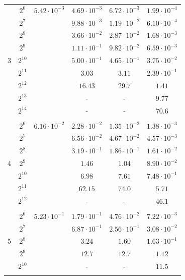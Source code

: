 \documentclass[12pt,oneside]{amsart}
\numberwithin{equation}{section}
\theoremstyle{definition}
\begin{document}
\begin{figure}[p]
{\begin{tabular}{|c|c|cccc|}
          & $2^{6}$ & $5.42 \cdot 10^{-3}$ & $4.69\cdot 10^{-3}$ & $6.72\cdot 10^{-3}$ & $1.99\cdot 10^{-4}$ \\
          & $2^{7}$ & & $9.88\cdot 10^{-3}$ & $1.19\cdot 10^{-2}$ & $6.10\cdot 10^{-4}$ \\
          & $2^{8}$ & & $3.66\cdot 10^{-2}$ & $2.87\cdot 10^{-2}$ & $1.68\cdot 10^{-3}$ \\
          & $2^{9}$ & & $1.11\cdot 10^{-1}$ & $9.82\cdot 10^{-2}$ & $6.59\cdot 10^{-3}$ \\
      3 & $2^{10}$ & & $5.00\cdot 10^{-1}$ & $4.65\cdot 10^{-1}$ & $3.75\cdot 10^{-2}$ \\
          & $2^{11}$ & & $3.03$ & $3.11$ & $2.39\cdot 10^{-1}$ \\
          & $2^{12}$ & & $16.43$ & $29.7$ & $1.41$ \\
          & $2^{13}$ & & - & - & $9.77$ \\
          & $2^{14}$ & & - & - & $70.6$ \\ \hline & &&&&\\[-1em]

          & $2^{6}$ & $6.16 \cdot 10^{-2}$ & $2.28\cdot 10^{-2}$ & $1.35\cdot 10^{-2}$ & $1.38\cdot 10^{-3}$ \\
          & $2^{7}$ & & $6.56\cdot 10^{-2}$ & $4.67\cdot 10^{-2}$ & $4.57\cdot 10^{-3}$ \\
          & $2^{8}$ & & $3.19 \cdot 10^{-1}$ & $1.86\cdot 10^{-1}$ & $1.61\cdot 10^{-2}$ \\
      4 & $2^{9}$ & & $1.46$ & $1.04$ & $8.90\cdot 10^{-2}$ \\
          & $2^{10}$ & & $6.98$ & $7.61$ & $7.48\cdot 10^{-1}$ \\
          & $2^{11}$ & & $62.15$ & $74.0$ & $5.71$ \\
          & $2^{12}$ & & - & - & $46.1$ \\ \hline & &&&&\\[-1em]

          & $2^{6}$ & $5.23\cdot 10^{-1}$ & $1.79\cdot 10^{-1}$ & $4.76\cdot 10^{-2}$ & $7.22\cdot 10^{-3}$ \\
          & $2^{7}$ & & $6.87\cdot 10^{-1}$ & $2.56\cdot 10^{-1}$ & $3.08 \cdot 10^{-2}$ \\
      5 & $2^{8}$ & & $3.24$ & $1.60$& $1.63\cdot 10^{-1}$ \\
          & $2^{9}$ & & $12.7$ & $12.7$ & $1.12$ \\
          & $2^{10}$ & & - & - & $11.5$ \\ \hline & &&&&\\[-1em]


\end{tabular}}
\end{figure}
\end{document}
